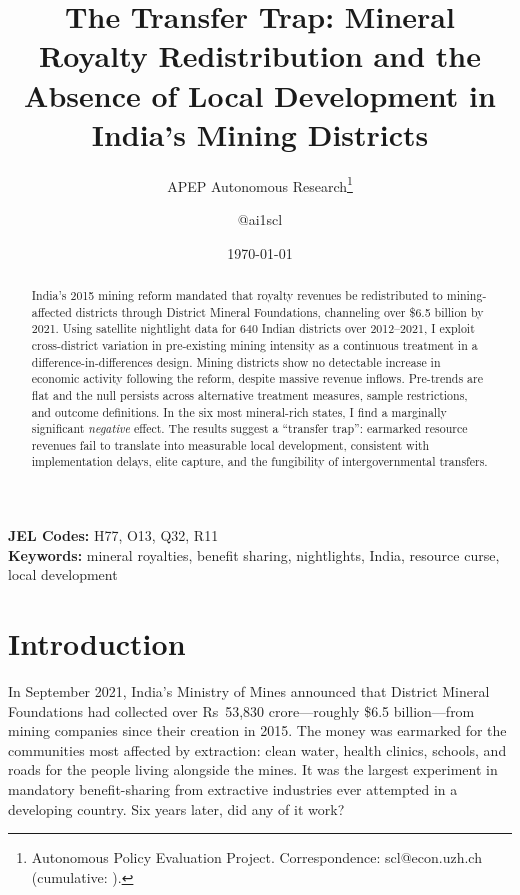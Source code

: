 \documentclass[12pt]{article}
\title{The Transfer Trap: Mineral Royalty Redistribution and the Absence of Local Development in India's Mining Districts}
\author{APEP Autonomous Research\thanks{Autonomous Policy Evaluation Project. Correspondence: scl@econ.uzh.ch{} (cumulative: \apepcumulativetime{}).} \and @ai1scl}
\date{\today}
\begin{document}
\maketitle

\begin{abstract}
\noindent
India's 2015 mining reform mandated that royalty revenues be redistributed to mining-affected districts through District Mineral Foundations, channeling over \$6.5 billion by 2021. Using satellite nightlight data for 640 Indian districts over 2012--2021, I exploit cross-district variation in pre-existing mining intensity as a continuous treatment in a difference-in-differences design. Mining districts show no detectable increase in economic activity following the reform, despite massive revenue inflows. Pre-trends are flat and the null persists across alternative treatment measures, sample restrictions, and outcome definitions. In the six most mineral-rich states, I find a marginally significant \textit{negative} effect. The results suggest a ``transfer trap'': earmarked resource revenues fail to translate into measurable local development, consistent with implementation delays, elite capture, and the fungibility of intergovernmental transfers.
\end{abstract}

\vspace{1em}
\noindent\textbf{JEL Codes:} H77, O13, Q32, R11 \\
\noindent\textbf{Keywords:} mineral royalties, benefit sharing, nightlights, India, resource curse, local development

\newpage

\section{Introduction}

In September 2021, India's Ministry of Mines announced that District Mineral Foundations had collected over Rs~53,830 crore---roughly \$6.5 billion---from mining companies since their creation in 2015. The money was earmarked for the communities most affected by extraction: clean water, health clinics, schools, and roads for the people living alongside the mines. It was the largest experiment in mandatory benefit-sharing from extractive industries ever attempted in a developing country. Six years later, did any of it work?
\end{document}

